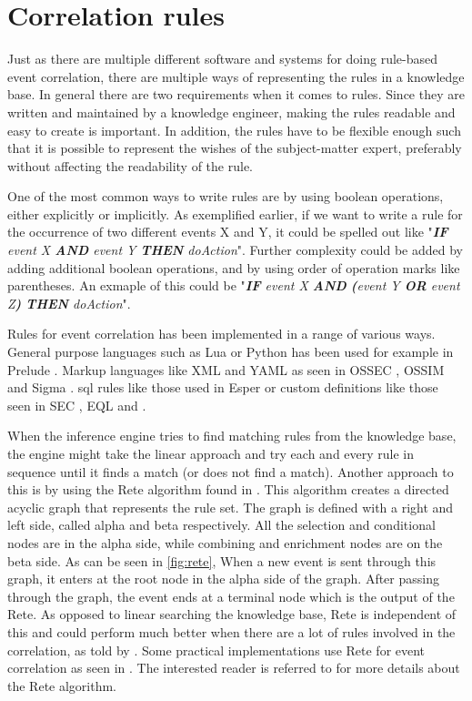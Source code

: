\section{Correlation rules}
\label{sec:rules}
Just as there are multiple different software and systems for doing rule-based event correlation, there are multiple ways of representing the rules in a knowledge base. In general there are two requirements when it comes to rules. Since they are written and maintained by a knowledge engineer, making the rules readable and easy to create is important. In addition, the rules have to be flexible enough such that it is possible to represent the wishes of the subject-matter expert, preferably without affecting the readability of the rule.

One of the most common ways to write rules are by using boolean operations, either explicitly or implicitly. As exemplified earlier, if we want to write a rule for the occurrence of two different events X and Y, it could be spelled out like "\textit{\textbf{IF} event X \textbf{AND} event Y \textbf{THEN} doAction}". Further complexity could be added by adding additional boolean operations, and by using order of operation marks like parentheses. An exmaple of this could be "\textit{\textbf{IF} event X \textbf{AND} \textbf{(}event Y \textbf{OR} event Z\textbf{)} \textbf{THEN} doAction}".

Rules for event correlation has been implemented in a range of various ways. General purpose languages such as Lua or Python has been used for example in Prelude \cite{Prelude:online}. Markup languages like XML and YAML as seen in OSSEC \cite{OSSECRules}, OSSIM \cite{OSSIM-rules} and Sigma \cite{Sigma}. \acrfull{sql} rules like those used in Esper \cite{EsperEsp68:online} or custom definitions like those seen in SEC \cite{SEC}, EQL \cite{eqlsyntax} and \textcite{Splunk}.

When the inference engine tries to find matching rules from the knowledge base, the engine might take the linear approach and try each and every rule in sequence until it finds a match (or does not find a match). Another approach to this is by using the Rete algorithm found in \textcite{forgy1989rete}. This algorithm creates a directed acyclic graph that represents the rule set. The graph is defined with a right and left side, called alpha and beta respectively. All the selection and conditional nodes are in the alpha side, while combining and enrichment nodes are on the beta side. As can be seen in \cref{fig:rete}, When a new event is sent through this graph, it enters at the root node in the alpha side of the graph. After passing through the graph, the event ends at a terminal node which is the output of the Rete. As opposed to linear searching the knowledge base, Rete is independent of this and could perform much better when there are a lot of rules involved in the correlation,  as told by \textcite{pouget2003alert}. Some practical implementations use Rete for event correlation as seen in \textcite{doorenbos1995production}. The interested reader is referred to \textcite{forgy1989rete} for more details about the Rete algorithm.

